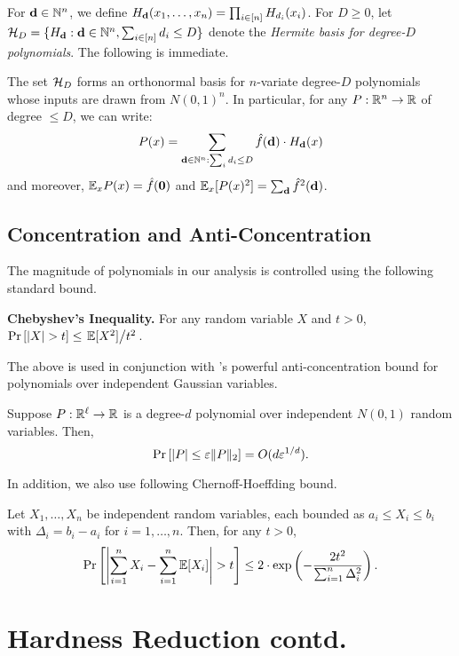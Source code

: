 For $\mbf{d} \in \N^n$, we define $H_{\mbf{d}}(x_1, \dots, x_n) = \prod_{i \in [n]} H_{d_i}(x_i)$. For $D \geq 0$, let $\mc{H}_D = \{H_{\mbf{d}} : \mbf{d} \in \N^n, \sum_{i \in [n]} d_i \leq D\}$ denote the {\em Hermite basis for degree-$D$ polynomials}. The following is immediate.

\begin{fact}
	The set $\mathcal{H}_D$ forms an orthonormal basis for $n$-variate degree-$D$ polynomials whose inputs are drawn from $N(0,1)^n$. In particular, for any $P: {\mathbb{R}}^n \to {\ensuremath{\mathbb{R}}}$ of degree $\leq D$, we can write:
	$$P(x) = \sum_{\mbf{d} \in \N^n: \sum_i d_i \leq D} \hat{f}(\mbf{d}) \cdot H_{\mbf{d}}(x)$$ 
	and moreover, $\E_{x} P(x) = \hat{f}(\mbf{0})$ and $\E_x[P(x)^2] = \sum_{\mbf{d}} \hat{f}^2(\mbf{d})$.
\end{fact} 
\subsection{Concentration and Anti-Concentration}\label{sec-conc-anticonc}
The magnitude of polynomials in our analysis is controlled using the following standard bound.

\medskip
\noindent
\textbf{Chebyshev's Inequality.} For any random variable $X$ and $t > 0$, $\Pr\left[|X| > t\right] \leq \left.\mathbb{E}[X^2]\middle/t^2\right.$.

\medskip
\noindent
The above is used in conjunction with \cite{CW01}'s powerful anti-concentration bound for polynomials over independent Gaussian variables.
\begin{theorem}	\label{thm:carbery-wright-prelim}
	 Suppose $P: {\mathbb{R}}^\ell \to {\ensuremath{\mathbb{R}}}$ is a degree-$d$ polynomial over independent $N(0,1)$ random variables. Then,
	$$\Pr\left[|P| \leq \varepsilon \|P\|_2\right] = O(d\varepsilon^{1/d}).$$
\end{theorem}
In addition, we also use following Chernoff-Hoeffding bound.
\begin{theorem}\label{thm:chernoff}
	Let $X_1,\dots, X_n$ be independent random variables, each bounded as $a_i \leq X_i \leq b_i$ with $\Delta_i = b_i - a_i$ for $i = 1,\dots, n$. Then, for any $t > 0$,
	$$\Pr\left[\left|\sum_{i=1}^n X_i - \sum_{i=1}^n\mathbb{E}[X_i]\right| > t\right] \leq 2\cdot\textnormal{exp}\left(-\frac{2t^2}{\sum_{i=1}^n\Delta_i^2}\right).$$
\end{theorem}


\section{Hardness Reduction contd.}\label{sec:reduction-contd}
